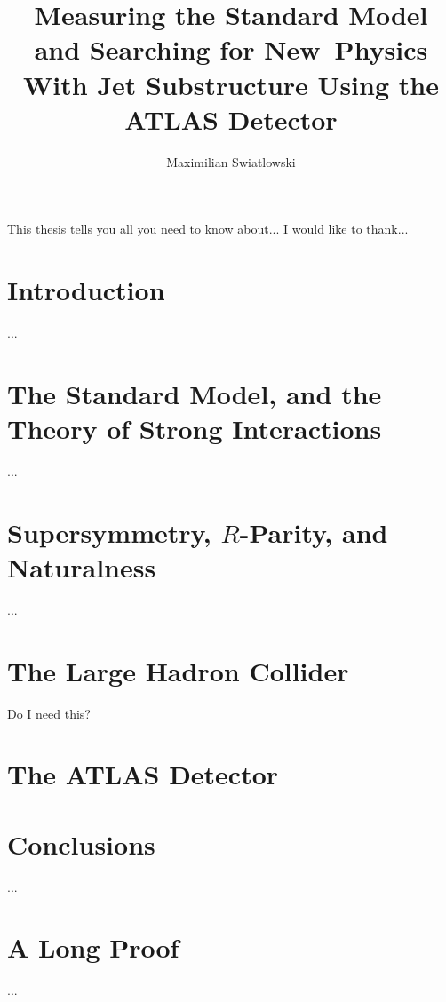\documentclass{report}
\begin{document}
\title{Measuring the Standard Model and Searching for New~Physics 
        With Jet Substructure Using the ATLAS Detector}
\author{Maximilian Swiatlowski}
 
\beforepreface
{}
    This thesis tells you all you need to know about...
    I would like to thank...
\afterpreface
 
\chapter{Introduction}
         ...

\chapter{The Standard Model, and the Theory of Strong Interactions}
		 ...

\chapter{Supersymmetry, $R$-Parity, and Naturalness}
		 ...

\chapter{The Large Hadron Collider}
		 Do I need this?

\chapter{The ATLAS Detector}





\chapter{Conclusions}
         ...
\appendix
\chapter{A Long Proof}
         ...


\end{document}
